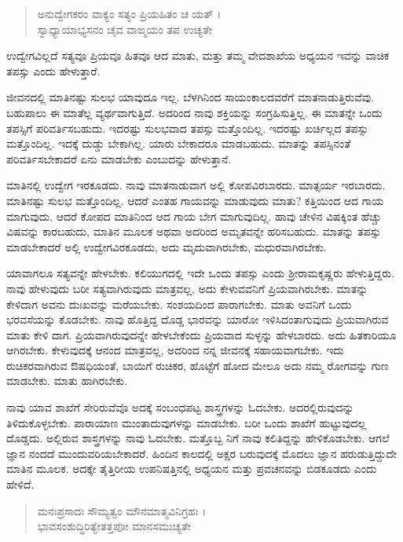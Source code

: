 \begin{verse}
ಅನುದ್ವೇಗಕರಂ ವಾಕ್ಯಂ ಸತ್ಯಂ ಪ್ರಿಯಹಿತಂ ಚ ಯತ್ ।\\ಸ್ವಾಧ್ಯಾಯಾಭ್ಯಸನಂ ಚೈವ ವಾಙ್ಮಯಂ ತಪ ಉಚ್ಯತೇ 
\end{verse}

{\small ಉದ್ವೇಗವಿಲ್ಲದೆ ಸತ್ಯವೂ ಪ್ರಿಯವೂ ಹಿತವೂ ಆದ ಮಾತು, ಮತ್ತು ತಮ್ಮ ವೇದಶಾಖೆಯ ಅಧ್ಯಯನ ಇವನ್ನು ವಾಚಿಕ ತಪಸ್ಸು ಎಂದು ಹೇಳುತ್ತಾರೆ.}

ಜೀವನದಲ್ಲಿ ಮಾತಿನಷ್ಟು ಸುಲಭ ಯಾವುದೂ ಇಲ್ಲ. ಬೆಳಗಿನಿಂದ ಸಾಯಂಕಾಲದವರೆಗೆ ಮಾತನಾಡುತ್ತಿರುವೆವು. ಬಹುಪಾಲು ಈ ಮಾತೆಲ್ಲ ವ್ಯರ್ಥವಾಗುತ್ತಿದೆ. ಅದರಿಂದ ನಾವು ಶಕ್ತಿಯನ್ನು ಸಂಗ್ರಹಿಸುತ್ತಿಲ್ಲ. ಈ ಮಾತನ್ನೇ ಒಂದು ತಪಸ್ಸಿಗೆ ಪರಿವರ್ತಿಸಬಹುದು. ಇದರಷ್ಟು ಸುಲಭವಾದ ತಪಸ್ಸು ಮತ್ತೊಂದಿಲ್ಲ. ಇದರಷ್ಟು ಖರ್ಚಿಲ್ಲದ ತಪಸ್ಸು ಮತ್ತೊಂದಿಲ್ಲ. ಇದಕ್ಕೆ ದುಡ್ಡು ಬೇಕಾಗಿಲ್ಲ. ಯಾರು ಬೇಕಾದರೂ ಮಾಡಬಹುದು. ಮಾತನ್ನು ತಪಸ್ಸಿನಂತೆ ಪರಿವರ್ತಿಸಬೇಕಾದರೆ ಏನು ಮಾಡಬೇಕು ಎಂಬುದನ್ನು ಹೇಳುತ್ತಾನೆ.

ಮಾತಿನಲ್ಲಿ ಉದ್ವೇಗ ಇರಕೂಡದು. ನಾವು ಮಾತನಾಡುವಾಗ ಅಲ್ಲಿ ಕೋಪವಿರಬಾರದು. ಮಾತ್ಸರ್ಯ ಇರಬಾರದು. ಮಾತಿನಷ್ಟು ಸುಲಭ ಮತ್ತೊಂದಿಲ್ಲ. ಆದರೆ ಎಂತಹ ಗಾಯವನ್ನು ಮಾಡುವುದು ಮಾತು? ಕತ್ತಿಯಿಂದ ಆದ ಗಾಯ ಮಾಗುವುದು. ಆದರೆ ಕೋಪದ ಮಾತಿನಿಂದ ಆದ ಗಾಯ ಬೇಗ ಮಾಗುವುದಿಲ್ಲ. ಹಾವು ಚೇಳಿನ ವಿಷಕ್ಕಿಂತ ಹೆಚ್ಚು ವಿಷವನ್ನು ಕಾರಬಹುದು, ಮಾತಿನ ಮೂಲಕ ಅಥವಾ ಅದರಿಂದ ಅಮೃತವನ್ನೇ ಹರಿಸಬಹುದು. ಮಾತನ್ನು ತಪಸ್ಸು ಮಾಡಬೇಕಾದರೆ ಅಲ್ಲಿ ಉದ್ವೇಗವಿರಕೂಡದು, ಅದು ಮೃದುವಾಗಿರಬೇಕು, ಮಧುರವಾಗಿರಬೇಕು.

ಯಾವಾಗಲೂ ಸತ್ಯವನ್ನೇ ಹೇಳಬೇಕು. ಕಲಿಯುಗದಲ್ಲಿ ಇದೇ ಒಂದು ತಪಸ್ಸು ಎಂದು ಶ್ರೀರಾಮಕೃಷ್ಣರು ಹೇಳುತ್ತಿದ್ದರು. ನಾವು ಹೇಳುವುದು ಬರೀ ಸತ್ಯವಾಗಿರುವುದು ಮಾತ್ರವಲ್ಲ, ಅದು ಕೇಳುವವನಿಗೆ ಪ್ರಿಯವಾಗಿರಬೇಕು. ಮಾತನ್ನು ಕೇಳಿದಾಗ ಅವನು ದುಃಖವನ್ನು ಮರೆಯಬೇಕು. ಸಂಶಯದಿಂದ ಪಾರಾಗಬೇಕು. ಮಾತು ಅವನಿಗೆ ಒಂದು ಭರವಸೆಯನ್ನು ಕೊಡಬೇಕು. ನಾವು ಹೊತ್ತಿದ್ದ ದೊಡ್ಡ ಭಾರವನ್ನು ಯಾರೋ ಇಳಿಸಿದಂತಾಗುವುದು ಪ್ರಿಯವಾಗಿರುವ ಮಾತು ಕೇಳಿ ದಾಗ. ಪ್ರಿಯವಾಗಿರುವುದನ್ನೇ ಹೇಳಬೇಕೆಂದು ಪ್ರಿಯವಾದ ಸುಳ್ಳನ್ನು ಹೇಳಬಾರದು. ಅದು ಹಿತಕಾರಿಯೂ ಆಗಿರಬೇಕು. ಕೇಳುವುದಕ್ಕೆ ಆನಂದ ಮಾತ್ರವಲ್ಲ, ಅದರಿಂದ ನನ್ನ ಜೀವನಕ್ಕೆ ಸಹಾಯವಾಗಬೇಕು. ಇದು ರುಚಿಕರವಾಗಿರುವ ಔಷಧಿಯಂತೆ, ಬಾಯಿಗೆ ರುಚಿಕರ, ಹೊಟ್ಟೆಗೆ ಹೋದ ಮೇಲೂ ಅದು ನಮ್ಮ ರೋಗವನ್ನು ಗುಣ ಮಾಡಬೇಕು. ಮಾತು ಹಾಗಿರಬೇಕು.

ನಾವು ಯಾವ ಶಾಖೆಗೆ ಸೇರಿರುವೆವೊ ಅದಕ್ಕೆ ಸಂಬಂಧಪಟ್ಟ ಶಾಸ್ತ್ರಗಳನ್ನು ಓದಬೇಕು. ಅದರಲ್ಲಿರುವುದನ್ನು ತಿಳಿದುಕೊಳ್ಳಬೇಕು. ಪಾರಾಯಾಣ ಮುಂತಾದುವುಗಳನ್ನು ಮಾಡಬೇಕು. ಬರೀ ಒಂದು ಶಾಖೆಗೆ ಹುಟ್ಟುವುದಲ್ಲ ದೊಡ್ಡದು. ಅಲ್ಲಿರುವ ಶಾಸ್ತ್ರಗಳನ್ನು ನಾವು ಓದಬೇಕು. ಮತ್ತೊಬ್ಬ ನಿಗೆ ನಾವು ಕಲಿತಿದ್ದನ್ನು ಹೇಳಿಕೊಡಬೇಕು. ಆಗಲೆ ಜ್ಞಾನ ನಂದದೆ ಮುಂದುವರಿಯಬೇಕಾದರೆ. ಹಿಂದಿನ ಕಾಲದಲ್ಲಿ ಅಕ್ಷರ ಬರುವುದಕ್ಕೆ ಮೊದಲು ಜ್ಞಾನ ಹರುಡುತ್ತಿದ್ದುದೇ ಮಾತಿನ ಮೂಲಕ. ಅದಕ್ಕೇ ತೈತ್ತಿರೀಯ ಉಪನಿಷತ್ತಿನಲ್ಲಿ ಅಧ್ಯಯನ ಮತ್ತು ಪ್ರವಚನವನ್ನು ಬಿಡಕೂಡದು ಎಂದು ಹೇಳಿದೆ.

\begin{verse}
ಮನಃಪ್ರಸಾದಃ ಸೌಮ್ಯತ್ವಂ ಮೌನಮಾತ್ಮವಿನಿಗ್ರಹಃ ।\\ಭಾವಸಂಶುದ್ಧಿರಿತ್ಯೇತತ್ತಪೋ ಮಾನಸಮುಚ್ಯತೇ 
\end{verse}

